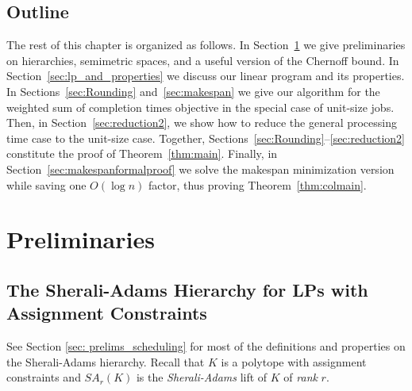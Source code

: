   
  
  
  
  
  
  
  \subsection{Outline}
  
  The rest of this chapter is organized as follows.
  In Section~\ref{sec:preliminaries} we give preliminaries on hierarchies, semimetric spaces, and a useful version of the Chernoff bound.
  In Section~\ref{sec:lp_and_properties}
  we discuss our linear program and its properties.
  In Sections~\ref{sec:Rounding} and~\ref{sec:makespan}
  we give our algorithm for the weighted sum of completion times objective
  in the special case of unit-size jobs.
  Then, in Section~\ref{sec:reduction2},
  we show how to reduce the general processing time case
  to the unit-size case.
  Together,
  Sections~\ref{sec:Rounding}--\ref{sec:reduction2}
  constitute the proof of Theorem~\ref{thm:main}.
  Finally,
  in Section~\ref{sec:makespanformalproof}
  we solve the makespan minimization version
  while saving one $O(\log n)$ factor,
  thus proving
  Theorem~\ref{thm:colmain}.
  
  
  
  
  \section{Preliminaries}
  \label{sec:preliminaries}
  
  
  \subsection{The Sherali-Adams Hierarchy for LPs with Assignment Constraints\label{sec:SheraliAdamsHierarchy}}
  See Section \ref{sec: prelims_scheduling} for most of the definitions and properties on the Sherali-Adams hierarchy.
Recall that $K$ is a polytope with assignment constraints and $SA_r(K)$ is the \emph{Sherali-Adams} lift of $K$ of \emph{rank} $r$.


  
